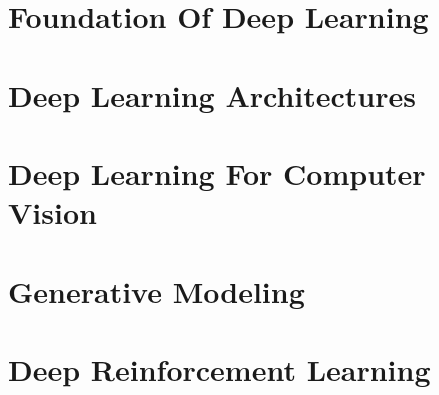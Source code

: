 \documentclass[10pt, a4paper, landscape]{extarticle}
\author{Fabio Bühler, fabuehle@ethz.ch}
\begin{document}
    \setlength{\columnseprule}{0.5pt} %
    \begin{multicols*}{4} %
    \begin{adjustwidth}{1mm}{1mm} %


            \section{Foundation Of Deep Learning}
                

            \section{Deep Learning Architectures}
                

            \section{Deep Learning For Computer Vision}
                

            \section{Generative Modeling}
                

            \section{Deep Reinforcement Learning}
                


    \end{adjustwidth}%
    \end{multicols*}
\end{document}
